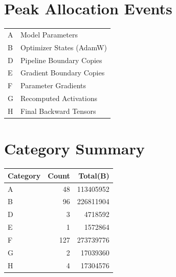 \documentclass{article}
\begin{document}
\section*{Peak Allocation Events}
\small
\begin{tabular}{ll}
A & Model Parameters \\
B & Optimizer States (AdamW) \\
D & Pipeline Boundary Copies \\
E & Gradient Boundary Copies \\
F & Parameter Gradients \\
G & Recomputed Activations \\
H & Final Backward Tensors \\
\end{tabular}
\vspace{0.5em}
\section*{Category Summary}
\begin{tabular}{l r r}
Category & Count & Total(B) \\
\hline
A & 48 & 113405952 \\
B & 96 & 226811904 \\
D & 3 & 4718592 \\
E & 1 & 1572864 \\
F & 127 & 273739776 \\
G & 2 & 17039360 \\
H & 4 & 17304576 \\
\end{tabular}
\vspace{0.5em}
\end{document}
